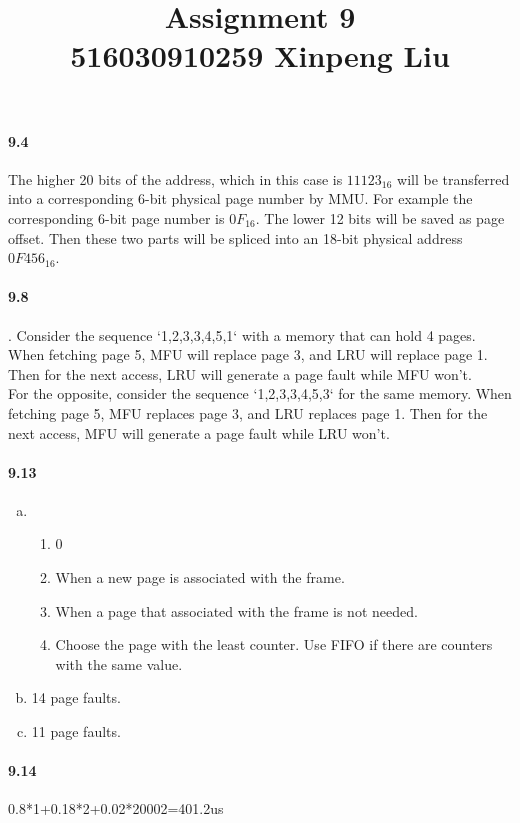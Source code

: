 \documentclass[12pt,a4]{article}
\date{}
\title{
	Assignment 9\\
	\vspace{3mm}
	{\normalsize 516030910259 \textbf{Xinpeng Liu}}
}
\begin{document}
	\maketitle
	\paragraph{9.4} The higher 20 bits of the address, which in this case is $11123_{16}$ will be transferred into a corresponding 6-bit physical page number by MMU. For example the corresponding 6-bit page number is $0F_{16}$. The lower 12 bits will be saved as page offset. Then these two parts will be spliced into an 18-bit physical address $0F456_{16}$. 
	\paragraph{9.8}.
	Consider the sequence `1,2,3,3,4,5,1` with a memory that can hold 4 pages. When fetching page 5, MFU will replace page 3, and LRU will replace page 1. Then for the next access, LRU will generate a page fault while MFU won't.\\
	For the opposite, consider the sequence `1,2,3,3,4,5,3` for the same memory. When fetching page 5, MFU replaces page 3, and LRU replaces page 1. Then for the next access, MFU will generate a page fault while LRU won't.
	\paragraph{9.13}
	\begin{enumerate}[a.]
		\item
			\begin{enumerate}
				\item 0
				\item When a new page is associated with the frame.
				\item When a page that associated with the frame is not needed.
				\item Choose the page with the least counter. Use FIFO if there are counters with the same value.
			\end{enumerate}
		\item 14 page faults.
		\item 11 page faults.
	\end{enumerate}
	\paragraph{9.14}
	0.8*1+0.18*2+0.02*20002=401.2us
\end{document}
